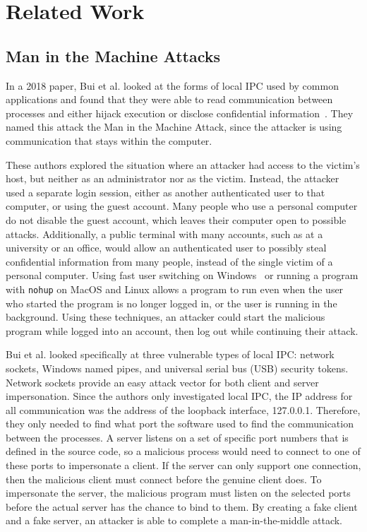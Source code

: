 \section{Related Work}
\label{sec:relatedWork}
\subsection{Man in the Machine Attacks}
\label{sec:manInMachineAttack}
In a 2018 paper, Bui et al. looked at the forms of local IPC used by common applications and found that they were able to read communication between processes and either hijack execution or disclose confidential information~\cite{MitMa}.  They named this attack the Man in the Machine Attack, since the attacker is using communication that stays within the computer.

These authors explored the situation where an attacker had access to the victim's host, but neither as an administrator nor as the victim.  Instead, the attacker used a separate login session, either as another authenticated user to that computer, or using the guest account.  Many people who use a personal computer do not disable the guest account, which leaves their computer open to possible attacks.  Additionally, a public terminal with many accounts, such as at a university or an office, would allow an authenticated user to possibly steal confidential information from many people, instead of the single victim of a personal computer.  Using fast user switching on Windows~\cite{microsoft_developers_network_2018} or running a program with \texttt{nohup} on MacOS and Linux allows a program to run even when the user who started the program is no longer logged in, or the user is running in the background.  Using these techniques, an attacker could start the malicious program while logged into an account, then log out while continuing their attack.

Bui et al. looked specifically at three vulnerable types of local IPC: network sockets, Windows named pipes, and universal serial bus (USB) security tokens.  Network sockets provide an easy attack vector for both client and server impersonation.  Since the authors only investigated local IPC, the IP address for all communication was the address of the loopback interface, 127.0.0.1.  Therefore, they only needed to find what port the software used to find the communication between the processes.  A server listens on a set of specific port numbers that is defined in the source code, so a malicious process would need to connect to one of these ports to impersonate a client.  If the server can only support one connection, then the malicious client must connect before the genuine client does.  To impersonate the server, the malicious program must listen on the selected ports before the actual server has the chance to bind to them.  By creating a fake client and a fake server, an attacker is able to complete a man-in-the-middle attack.

